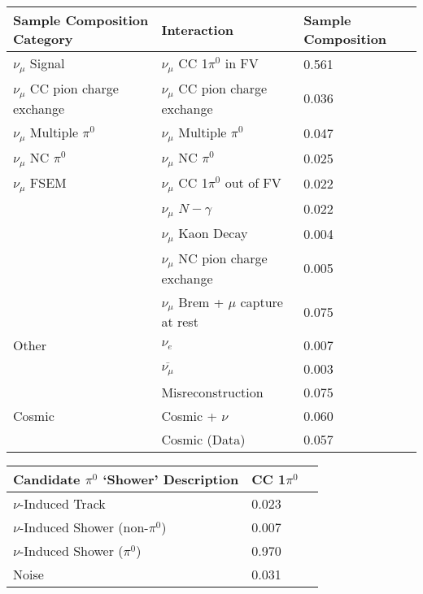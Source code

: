 \begin{table}[H]
\centering
{}
 \begin{tabular}{|l|l|l|}
 \hline
Sample Composition Category & Interaction & Sample Composition \\ [0.1ex] \hline
$\nu_\mu$ Signal & $\nu_\mu$ CC 1$\pi^0$ in FV & 0.561 \\ \hline
$\nu_\mu$ CC pion charge exchange & $\nu_\mu$ CC pion charge exchange & 0.036 \\ \hline
$\nu_\mu$ Multiple $\pi^0$ & $\nu_\mu$ Multiple $\pi^0$ & 0.047 \\ \hline
$\nu_\mu$ NC $\pi^0$ & $\nu_\mu$ NC $\pi^0$ & 0.025 \\ \hline
$\nu_\mu$ FSEM & $\nu_\mu$ CC 1$\pi^0$ out of FV & 0.022 \\
& $\nu_\mu$ $N-\gamma$ & 0.022 \\
& $\nu_\mu$ Kaon Decay & 0.004 \\
& $\nu_\mu$ NC pion charge exchange & 0.005 \\ 
&$\nu_\mu$ Brem + $\mu$ capture at rest & 0.075 \\ \hline
Other & $\nu_e$ &0.007 \\
&$\overline{\nu_\mu}$ & 0.003 \\
& Misreconstruction & 0.075 \\ \hline
Cosmic & Cosmic + $\nu$ & 0.060 \\
& Cosmic (Data) & 0.057 \\ \hline
\end{tabular}
\end{table}

\begin{table}[H]
\centering
{}
 \begin{tabular}{|l|l|l|}
 \hline
Candidate $\pi^0$ `Shower' Description & CC 1$\pi^0$ \\ [0.1ex] \hline
$\nu$-Induced Track & 0.023 \\ 
$\nu$-Induced Shower (non-$\pi^0$) & 0.007 \\ 
$\nu$-Induced Shower ($\pi^0$) & 0.970 \\ 
Noise & 0.031  \\ \hline
\end{tabular}
\end{table}

